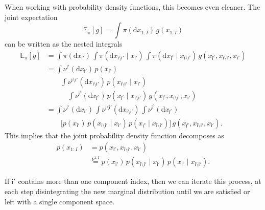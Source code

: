 \documentclass[
  letterpaper,
  DIV=11,
  numbers=noendperiod]{scrartcl}
\begin{document}
When working with probability density functions, this becomes even
cleaner. The joint expectation \[
\mathbb{E}_{\pi} [ g ]
=
\int \pi( \mathrm{d} x_{ 1:I } ) \, g( x_{1:I} )
\] can be written as the nested integrals \begin{align*}
\mathbb{E}_{\pi} [ g ]
&=
\int \pi( \mathrm{d} x_{ \mathsf{i'} } ) \,
\int \pi( \mathrm{d} x_{\mathsf{i} \setminus \mathsf{i}'} \mid
          x_{ \mathsf{i'} } ) \,
\int \pi( \mathrm{d} x_{\mathsf{i}^{c}} \mid
          x_{\mathsf{i} \setminus \mathsf{i}'} ) \,
g(
  x_{\mathsf{i}^{c}},
  x_{\mathsf{i} \setminus \mathsf{i}'},
  x_{ \mathsf{i'} }
)
\\
&=
\int \nu^{ \mathsf{i'} }( \mathrm{d} x_{ \mathsf{i'} } ) \,
p ( x_{ \mathsf{i'} } )
\\
&\quad\quad
\int \nu^{\mathsf{i} \setminus \mathsf{i}'}(
  \mathrm{d} x_{\mathsf{i} \setminus \mathsf{i}'}
) \,
p( x_{\mathsf{i} \setminus \mathsf{i}'} \mid
   x_{ \mathsf{i'} } )
\\
&\quad\quad\quad
\int \nu^{\mathsf{i}^{c}}( \mathrm{d} x_{\mathsf{i}^{c}} ) \,
p( x_{\mathsf{i}^{c}} \mid
   x_{\mathsf{i} \setminus \mathsf{i}'} ) \,
g(
  x_{\mathsf{i}^{c}},
  x_{\mathsf{i} \setminus \mathsf{i}'},
  x_{ \mathsf{i'} }
)
\\
&=
\int \nu^{ \mathsf{i'} }( \mathrm{d} x_{ \mathsf{i'} } ) \,
\int \nu^{\mathsf{i} \setminus \mathsf{i}'}(
  \mathrm{d} x_{\mathsf{i} \setminus \mathsf{i}'}
) \,
\int \nu^{\mathsf{i}^{c}}( \mathrm{d} x_{\mathsf{i}^{c}} ) \,
\\
&\quad\quad
\bigg[
p ( x_{ \mathsf{i'} } ) \,
p( x_{\mathsf{i} \setminus \mathsf{i}'} \mid
   x_{ \mathsf{i'} } ) \,
p( x_{\mathsf{i}^{c}} \mid
   x_{\mathsf{i} \setminus \mathsf{i}'} )
\bigg] \,
g(
  x_{\mathsf{i}^{c}},
  x_{\mathsf{i} \setminus \mathsf{i}'},
  x_{ \mathsf{i'} }
).
\end{align*} This implies that the joint probability density function
decomposes as \begin{align*}
p ( x_{1:I} )
&=
p ( x_{\mathsf{i}^{c}},
    x_{\mathsf{i} \setminus \mathsf{i}'},
    x_{ \mathsf{i'} } )
\\
&\overset{ \nu^{1:I} }{=}
p ( x_{ \mathsf{i'} } ) \,
p ( x_{\mathsf{i} \setminus \mathsf{i}'} \mid
    x_{ \mathsf{i'} } ) \,
p ( x_{\mathsf{i}^{c}} \mid
    x_{\mathsf{i} \setminus \mathsf{i}'} ).
\end{align*}

If \(\mathsf{i}'\) contains more than one component index, then we can
iterate this process, at each step disintegrating the new marginal
distribution until we are satisfied or left with a single component
space.
\end{document}
